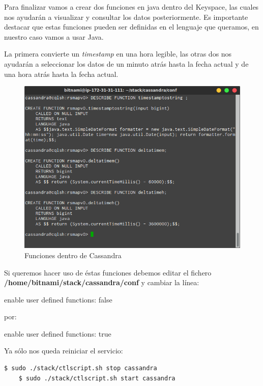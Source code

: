Para finalizar vamos a crear dos funciones en java dentro del Keyspace, las cuales nos ayudarán a visualizar y consultar los datos posteriormente. Es importante destacar que estas funciones pueden ser definidas en el lenguaje que queramos, en nuestro caso vamos a usar Java.

\bigskip

La primera convierte un \textit{timestamp} en una hora legible, las otras dos nos ayudarán a seleccionar los datos de un minuto atrás hasta la fecha actual y de una hora atrás hasta la fecha actual.

\begin{figure}[!ht]
  \begin{center}
    \includegraphics[scale=0.65]{../images/cassandra/5.png}
		\caption{Funciones dentro de Cassandra}
    \label{fig:kaa}
	\end{center}
\end{figure}

\newpage

Si queremos hacer uso de éstas funciones debemos editar el fichero \textbf{/home/bitnami/stack/cassandra/conf} y cambiar la línea:

enable user defined functions: false

por:

enable user defined functions: true

\bigskip

Ya sólo nos queda reiniciar el servicio:

\begin{lstlisting}[language=bash,caption={Reiniciando Cassandra},label={lst:rcas}]
	$ sudo ./stack/ctlscript.sh stop cassandra
	$ sudo ./stack/ctlscript.sh start cassandra
\end{lstlisting}

